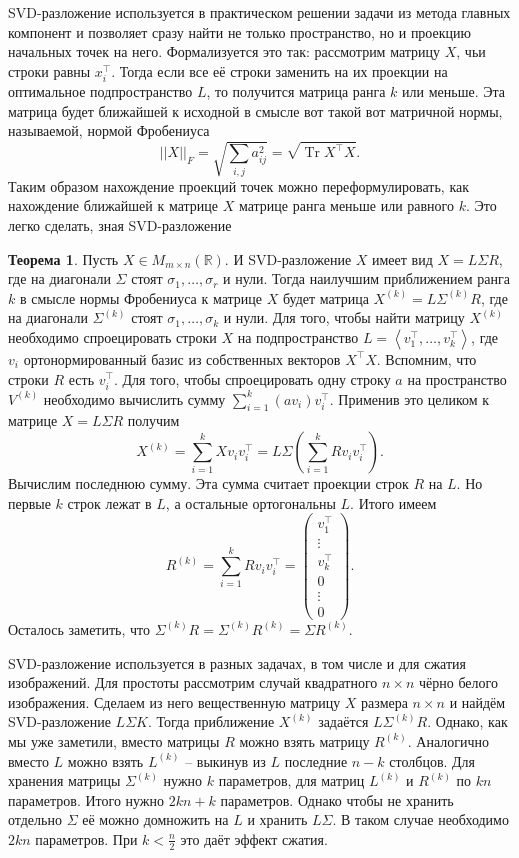 \documentclass[10pt,a4paper,oneside]{book}
\theoremstyle{definition}
\newtheorem{thm}{{\color{red!40!black} Теорема}}
\newcommand{\mb}[1]{\mathbb{#1}}
\newcommand{\Tr}{\operatorname{Tr}}
\def\lan{\left\langle }
\def\ran{\right\rangle}
\def\thrm{\begin{thm}}
\def\ethrm{\end{thm}}
\def\pmat{\begin{pmatrix}}
\def\epmat{\end{pmatrix}}
\begin{document}
SVD-разложение используется в практическом решении задачи из метода главных компонент и позволяет сразу найти не только пространство, но и проекцию начальных точек на него. Формализуется это так: рассмотрим матрицу $X$, чьи строки равны $x_i^{\top}$. Тогда если все её строки заменить на их проекции на оптимальное подпространство $L$, то получится матрица ранга $k$ или меньше. Эта матрица будет ближайшей к исходной в смысле вот такой вот матричной нормы, называемой, нормой Фробениуса 
$$||X||_F=\sqrt{\sum_{i,j} a_{ij}^2}=\sqrt{\Tr X^{\top}X}.$$
Таким образом нахождение проекций точек можно переформулировать, как нахождение ближайшей к матрице $X$ матрице ранга меньше или равного $k$. Это легко сделать, зная SVD-разложение

\thrm Пусть $X\in M_{m\times n}(\mb R)$. И SVD-разложение $X$ имеет вид $X=L\Sigma R$, где на диагонали $\Sigma$ стоят $\sigma_1,\dots,\sigma_r$ и нули. Тогда наилучшим приближением ранга $k$ в смысле нормы Фробениуса к матрице $X$ будет матрица $X^{(k)}=L\Sigma^{(k)}R$, где на диагонали $\Sigma^{(k)}$ стоят $\sigma_1,\dots,\sigma_{k}$ и нули.
\proof Для того, чтобы найти матрицу $X^{(k)}$ необходимо спроецировать строки $X$ на подпространство $L=\lan v_1^{\top},\dots,v_k^{\top}\ran$, где $v_i$ ортонормированный базис из собственных векторов $X^{\top}X$.  Вспомним, что строки $R$ есть $v_i^{\top}$. Для того, чтобы спроецировать одну строку $a$ на пространство $V^{(k)}$ необходимо вычислить сумму $\sum_{i=1}^k (av_i)v_i^{\top}$. Применив это целиком к матрице $X=L\Sigma R$ получим 
$$X^{(k)}=\sum_{i=1}^k Xv_iv_i^{\top}=L\Sigma \left(\sum_{i=1}^k Rv_iv_i^{\top}\right).$$
Вычислим последнюю сумму. Эта сумма считает проекции строк $R$ на $L$. Но первые $k$ строк лежат в $L$, а остальные ортогональны $L$. Итого имеем
$$R^{(k)}=\sum_{i=1}^k Rv_iv_i^{\top} = \pmat v_1^{\top} \\ \vdots \\ v_k^{\top} \\ 0 \\ \vdots \\ 0 \epmat.$$
Осталось заметить, что $\Sigma^{(k)} R= \Sigma^{(k)}R^{(k)}=\Sigma R^{(k)}$.
\endproof
\ethrm 

SVD-разложение используется в разных задачах, в том числе и для сжатия изображений.  Для простоты рассмотрим случай квадратного $n \times n$ чёрно белого изображения. Сделаем из него вещественную матрицу $X$ размера $n \times n$ и найдём SVD-разложение $L \Sigma K$. Тогда приближение $X^{(k)}$ задаётся $L\Sigma^{(k)}R$. Однако, как мы уже заметили, вместо матрицы $R$ можно взять матрицу $R^{(k)}$. Аналогично вместо $L$ можно взять $L^{(k)}$ -- выкинув из $L$ последние $n-k$ столбцов. Для хранения матрицы $\Sigma^{(k)}$ нужно $k$ параметров, для матриц $L^{(k)}$ и $R^{(k)}$ по $kn$ параметров. Итого нужно $2kn+k$ параметров. Однако чтобы не хранить отдельно $\Sigma$ её можно домножить на $L$ и хранить $L\Sigma$. В таком случае необходимо $2kn$ параметров. При $k<\frac{n}{2}$ это даёт эффект сжатия. 
\end{document}
